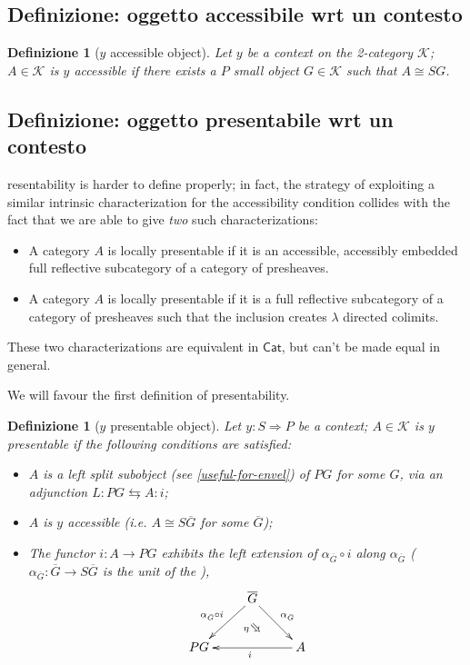 \documentclass[11pt]{article}
\def\Cat{\mathsf{Cat}}
\def\To{\Rightarrow}
\newcommand{\Searrow}{\rotatebox[origin=c]{-45}{$\Rightarrow$}} %
\theoremstyle{reference}
\newtheorem{definition}[theorem]{Definizione}
\begin{document}
\subsection{Definizione: oggetto accessibile wrt un contesto}
\label{sec:org1827f38}

\begin{definition}[$y$ accessible object]\label{yonacc}
	Let $y$ be a context on the 2-category $\mathcal K$; $A\in\mathcal K$ is $y$ \emph{accessible} if there exists a $ P $ small object $G\in \mathcal K$ such that $A\cong S  G$.
\end{definition}


\subsection{Definizione: oggetto presentabile wrt un contesto}
\label{sec:orgac956e4}

resentability is harder to define properly; in fact, the strategy of exploiting a similar intrinsic characterization for the accessibility condition collides with the fact that we are able to give \emph{two} such characterizations:
\begin{itemize}
	\item \label{llp:uno} A category $A$ is locally presentable if it is an accessible, accessibly embedded full reflective subcategory of a category of presheaves.
	\item \label{llp:due} A category $A$ is locally presentable if it is a full reflective subcategory of a category of presheaves such that the inclusion creates $\lambda$ directed colimits.
\end{itemize}
These two characterizations are equivalent in \(\Cat\), but can't be made equal in general.

We will favour the first definition of presentability.
\begin{definition}[$y$ presentable object]\label{yonpres}
	Let $y : S \To P$ be a context; $A\in\mathcal K$ is $y$ \emph{presentable} if the following conditions are satisfied:
	\begin{itemize}
		\item \label{p:uno} $A$ is a left split subobject (see \autoref{useful-for-envel}) of $ P G$ for some $G$, via an adjunction $L :  P G \leftrightarrows A : i$;
		\item \label{p:due} $A$ is $y$ accessible (i.e. $A\cong S \overline G$ for some $\overline G$);
		\item \label{p:tre} The functor $i : A\to  P G$ exhibits the left extension of $\alpha_{\overline G}\circ i$ along $\alpha_{\overline G}$ ($\alpha_{\overline G} : \overline G \to S \overline G$ is the unit of the \kz),
		\[
			\vcenter{\xymatrix{
			&\overline G \ar@{}[d]|(.6){\eta\Searrow} \ar[dr]^{\alpha_{\bar G}} \ar[dl]_{\alpha_{\bar G}\circ i}& \\
			 P G && \ar[ll]^i A
			}}
		\]
	\end{itemize}
\end{definition}
\end{document}
